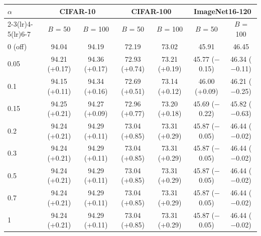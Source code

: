 \begin{tabular}{@{}lcccccc@{}}
\toprule
\multirow{2}{*}{$\alpha$} & \multicolumn{2}{c}{CIFAR-10} & \multicolumn{2}{c}{CIFAR-100} & \multicolumn{2}{c}{ImageNet16-120}\\
\cmidrule(lr){2-3}\cmidrule(lr){4-5}\cmidrule(lr){6-7}
 & $B$ = 50 & $B$ = 100 & $B$ = 50 & $B$ = 100 & $B$ = 50 & $B$ = 100\\
\midrule
0 (off) & 94.04 & 94.19 & 72.19 & 73.02 & 45.91 & 46.45\\
0.05 & 94.21 (+0.17) & 94.36 (+0.17) & 72.93 (+0.74) & 73.21 (+0.19) & 45.77 ($-$0.15) & 46.34 ($-$0.11)\\
0.1 & 94.15 (+0.11) & 94.34 (+0.16) & 72.69 (+0.51) & 73.14 (+0.12) & 46.00 (+0.09) & 46.21 ($-$0.25)\\
0.15 & 94.25 (+0.21) & 94.27 (+0.09) & 72.96 (+0.77) & 73.20 (+0.18) & 45.69 ($-$0.22) & 45.82 ($-$0.63)\\
0.2 & 94.24 (+0.21) & 94.29 (+0.11) & 73.04 (+0.85) & 73.31 (+0.29) & 45.87 ($-$0.05) & 46.44 ($-$0.02)\\
0.3 & 94.24 (+0.21) & 94.29 (+0.11) & 73.04 (+0.85) & 73.31 (+0.29) & 45.87 ($-$0.05) & 46.44 ($-$0.02)\\
0.5 & 94.24 (+0.21) & 94.29 (+0.11) & 73.04 (+0.85) & 73.31 (+0.29) & 45.87 ($-$0.05) & 46.44 ($-$0.02)\\
0.7 & 94.24 (+0.21) & 94.29 (+0.11) & 73.04 (+0.85) & 73.31 (+0.29) & 45.87 ($-$0.05) & 46.44 ($-$0.02)\\
1 & 94.24 (+0.21) & 94.29 (+0.11) & 73.04 (+0.85) & 73.31 (+0.29) & 45.87 ($-$0.05) & 46.44 ($-$0.02)\\
\bottomrule
\end{tabular}

